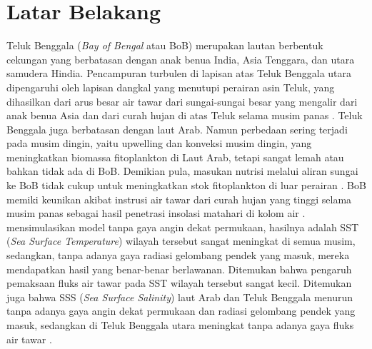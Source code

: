 \vspace{1.5pc}
\section[Latar Belakang]{Latar Belakang}
\begin{spacing}{1.5}
	Teluk Benggala (\textit{Bay of Bengal} atau BoB) merupakan lautan berbentuk cekungan yang berbatasan dengan anak benua India, Asia Tenggara, dan utara samudera Hindia. Pencampuran turbulen di lapisan atas Teluk Benggala utara dipengaruhi oleh lapisan dangkal yang menutupi perairan asin Teluk, yang dihasilkan dari arus besar air tawar dari sungai-sungai besar yang mengalir dari anak benua Asia dan dari curah hujan di atas Teluk selama musim panas . Teluk Benggala juga berbatasan dengan laut Arab. Namun perbedaan sering terjadi pada musim dingin, yaitu upwelling dan konveksi musim dingin, yang meningkatkan biomassa fitoplankton di Laut Arab, tetapi sangat lemah atau bahkan tidak ada di BoB. Demikian pula, masukan nutrisi melalui aliran sungai ke BoB tidak cukup untuk meningkatkan stok fitoplankton di luar perairan . BoB memiki keunikan akibat instrusi air tawar dari curah hujan yang tinggi selama musim panas sebagai hasil penetrasi insolasi matahari di kolom air \cite{Kantha2019}.  mensimulasikan model tanpa gaya angin dekat permukaan, hasilnya adalah SST (\textit{Sea Surface Temperature}) wilayah tersebut sangat meningkat di semua musim, sedangkan, tanpa adanya gaya radiasi gelombang pendek yang masuk, mereka mendapatkan hasil yang benar-benar berlawanan. Ditemukan bahwa pengaruh pemaksaan fluks air tawar pada SST wilayah tersebut sangat kecil. Ditemukan juga bahwa SSS (\textit{Sea Surface Salinity}) laut Arab dan Teluk Benggala menurun tanpa adanya gaya angin dekat permukaan dan radiasi gelombang pendek yang masuk, sedangkan di Teluk Benggala utara meningkat tanpa adanya gaya fluks air tawar .
	

\end{spacing}
